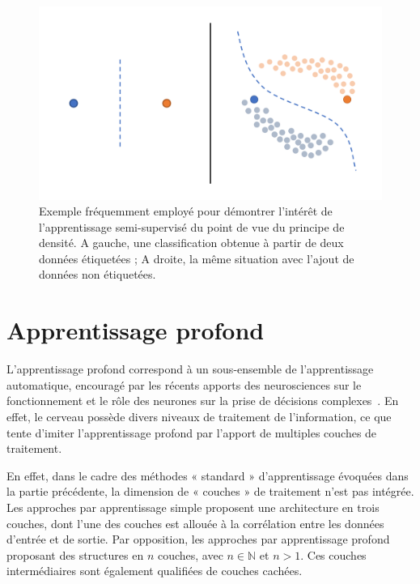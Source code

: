 \begin{figure}[H]
    \centering
    \includegraphics[width=\linewidth]{contents/chapter_3/resources/example_semi_supervised.pdf}
    \caption{Exemple fréquemment employé pour démontrer l'intérêt de l'apprentissage semi-supervisé du point de vue du principe de densité. A gauche, une classification obtenue à partir de deux données étiquetées ; A droite, la même situation avec l’ajout de données non étiquetées.}
    \label{fig:example_semi_supervised}
\end{figure}

\clearpage

\section{Apprentissage profond}
\label{sec:deep_learning}
L’apprentissage profond correspond à un sous-ensemble de l’apprentissage automatique, encouragé par les récents apports des neurosciences sur le fonctionnement et le rôle des neurones sur la prise de décisions complexes~\cite{Quartz1997,Shrager1996}. En effet, le cerveau possède divers niveaux de traitement de l’information, ce que tente d'imiter l'apprentissage profond par l'apport de multiples couches de traitement.\par

En effet, dans le cadre des méthodes « standard » d’apprentissage évoquées dans la partie précédente, la dimension de « couches » de traitement n’est pas intégrée. Les approches par apprentissage simple proposent une architecture en trois couches, dont l’une des couches est allouée à la corrélation entre les données d’entrée et de sortie. Par opposition, les approches par apprentissage profond proposant des structures en $n$ couches, avec $n \in \pmb{\mathbb{N}}$ et $n>1$. Ces couches intermédiaires sont également qualifiées de couches cachées.\par 


